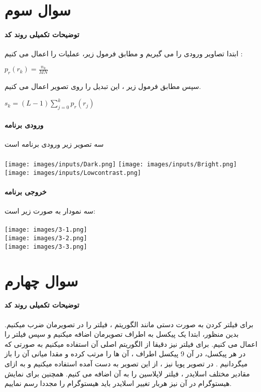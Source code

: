 \documentclass[12pt]{article}
\begin{document}
		\section{سوال سوم }
		\paragraph{توضیحات تکمیلی روند کد}
	ابتدا تصاویر ورودی را می گیریم و مطابق فرمول زیر، عملیات 
	را اعمال می کنیم :
	
	$p_r(r_k) = \frac{n_k}{MN}$
	
		سپس مطابق فرمول زیر ، این تبدیل را روی تصویر اعمال می کنیم.
		
		
		$s_k = (L-1) \sum_{j=0}^{k} p_r(r_j) $
		
		\paragraph{ورودی برنامه}
		سه تصویر زیر ورودی برنامه است \\
		\vspace{0.5cm}\\
		\texttt{[image: images/inputs/Dark.png]}
		\texttt{[image: images/inputs/Bright.png]}
		\texttt{[image: images/inputs/Lowcontrast.png]}
		\paragraph{خروجی برنامه}
		سه نمودار به صورت زیر است:\\
		\vspace{0.5cm}\\
		\texttt{[image: images/3-1.png]}\\
		\texttt{[image: images/3-2.png]}\\
		\texttt{[image: images/3-3.png]}
		
		\newpage
		\section{سوال چهارم }
		\paragraph{توضیحات تکمیلی روند کد}
		برای فیلتر کردن به صورت دستی مانند الگوریتم ، فیلتر را در تصویرمان ضرب میکنیم. بدین منظور، ابتدا یک پیکسل به اطراف تصویرمان اضافه میکنیم و سپس فیلتر را اعمال می کنیم. 
		برای فیلتر 
		نیز دقیقا از الگوریتم اصلی آن استفاده میکنیم به صورتی که در هر پیکسل، در آن 9 پیکسل اطراف ، آن ها را مرتب کرده و مقدا میانی آن را باز میگردانیم .
		در تصویر پویا نیز ، از این تصویر به دست آمده استفاده میکنیم و به ازای مقادیر مختلف اسلایدر ، فیلتر لاپلاسین را به آن اضافه می کنیم. همچنین برای نمایش هیستوگرام در آن نیز هربار تغییر اسلایدر باید هیستوگرام را مجددا رسم نماییم.	
		
\end{document}
